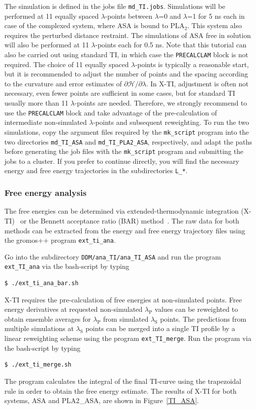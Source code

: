 The simulation is defined in the jobs file \texttt{md\_TI.jobs}. Simulations will be performed at 11 equally spaced $\lambda$-points between $\lambda$=0 and $\lambda$=1 for 5 ns each in case of the complexed system, where ASA is bound to PLA$_2$. This system also requires the perturbed distance restraint. The simulations of ASA free in solution will also be performed at 11 $\lambda$-points each for 0.5 ns.   
Note that this tutorial can also be carried out using standard TI, in which case the \texttt{PRECALCLAM} block is not required. 
The choice of 11 equally spaced $\lambda$-points is typically a reasonable start, but it is recommended to adjust the number of points and the spacing according to the curvature and error estimates of $\partial\mathcal{H}/\partial\lambda$. 
In X-TI, adjustment is often not necessary, even fewer points are sufficient in some cases, but for standard TI usually more than 11 $\lambda$-points are needed. 
Therefore, we strongly recommend to use the \texttt{PRECALCLAM} block and take advantage of the pre-calculation of intermediate non-simulated $\lambda$-points and subsequent reweighting.
To run the two simulations, copy the argument files required by the \texttt{mk\_script} program into the two directories \texttt{md\_TI\_ASA} and \texttt{md\_TI\_PLA2\_ASA}, respectively, and adapt the paths before generating the job files with the \texttt{mk\_script} program and submitting the jobs to a cluster. If you prefer to continue directly, you will find the necessary energy and free energy trajectories in the subdirectories \texttt{L\_*}.

\subsubsection{Free energy analysis}
The free energies can be determined via extended-thermodynamic integration (X-TI)~\cite{X_TI} or the Bennett acceptance ratio (BAR) method~\cite{bar}. The raw data for both methods can be extracted from the energy and free energy trajectory files using the gromos++ program \texttt{ext\_ti\_ana}. 

Go into the subdirectory \texttt{DDM/ana\_TI/ana\_TI\_ASA} and run the program \texttt{ext\_TI\_ana} via the bash-script by typing
\begin{lstlisting}
$ ./ext_ti_ana_bar.sh
\end{lstlisting}
%
X-TI requires the pre-calculation of free energies at non-simulated points. Free energy derivatives at requested non-simulated $\lambda_{\text{P}}$ values can be reweighted to obtain ensemble averages for $\lambda_{\text{P}}$ from simulated $\lambda_{\text{S}}$ points. The predictions from multiple simulations at $\lambda_{\text{S}}$ points can be merged into a single TI profile by a linear reweighting scheme using the program \texttt{ext\_TI\_merge}. 
Run the program via the bash-script by typing
\begin{lstlisting}
$ ./ext_ti_merge.sh
\end{lstlisting}
%
The program calculates the integral of the final TI-curve using the trapezoidal rule in order to obtain the free energy estimate. The results of X-TI for both systems, ASA and PLA2\_ASA, are shown in Figure~\ref{TI_ASA}.  


